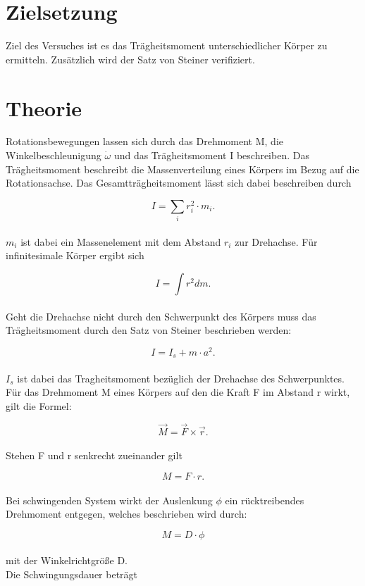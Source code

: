 \section{Zielsetzung}
Ziel des Versuches ist es das Trägheitsmoment unterschiedlicher Körper zu ermitteln.
Zusätzlich wird der Satz von Steiner verifiziert.


\section{Theorie}
Rotationsbewegungen lassen sich durch das Drehmoment M, die Winkelbeschleunigung $\dot{\omega} $ und das Trägheitsmoment I beschreiben.
Das Trägheitsmoment beschreibt die Massenverteilung eines Körpers im Bezug auf die Rotationsachse.
Das Gesamtträgheitsmoment lässt sich dabei beschreiben durch

\begin{equation*}
  I = \sum_i r_i^2 \cdot m_i.
\end{equation*}
\\$m_i$ ist dabei ein Massenelement mit dem Abstand $r_i$ zur Drehachse. Für infinitesimale Körper ergibt sich

\begin{equation*}
  I = \int r^2 dm.
\end{equation*}
\\Geht die Drehachse nicht durch den Schwerpunkt des Körpers muss das Trägheitsmoment durch den Satz von Steiner beschrieben werden:

\begin{equation}
  I = I_s + m \cdot a^2.
  \label{eqn:steiner}
\end{equation}
\\$I_s$ ist dabei das Tragheitsmoment bezüglich der Drehachse des Schwerpunktes.
Für das Drehmoment M eines Körpers auf den die Kraft F im Abstand r wirkt, gilt die Formel:

\begin{equation*}
  \vec{M} = \vec{F}\times \vec{r}.
\end{equation*}
\\Stehen F und r senkrecht zueinander gilt

\begin{equation*}
  M = F\cdot r.
\end{equation*}
\\Bei schwingenden System wirkt der Auslenkung $\phi$ ein rücktreibendes Drehmoment entgegen, welches beschrieben wird durch:

\begin{equation*}
  M = D \cdot \phi
\end{equation*}
\\mit der Winkelrichtgröße D.
\\Die Schwingungsdauer beträgt

